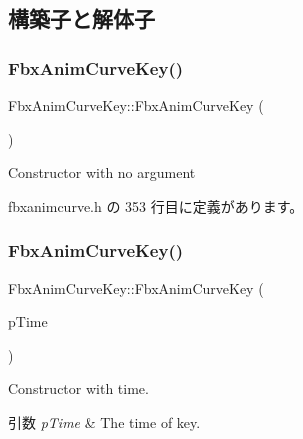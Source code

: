 \subsection{構築子と解体子}
\mbox{\label{class_fbx_anim_curve_key_acc70533fb017bc71b617aaa37ee2e19f}} 
\subsubsection{\texorpdfstring{Fbx\+Anim\+Curve\+Key()}{FbxAnimCurveKey()}\hspace{0.1cm}{\footnotesize\ttfamily [1/4]}}
{\footnotesize\ttfamily Fbx\+Anim\+Curve\+Key\+::\+Fbx\+Anim\+Curve\+Key (\begin{DoxyParamCaption}{ }\end{DoxyParamCaption})\hspace{0.3cm}{\ttfamily [inline]}}

Constructor with no argument 

 fbxanimcurve.\+h の 353 行目に定義があります。

\mbox{\label{class_fbx_anim_curve_key_a5fc23a90c53bc0655161813ee4f6ae00}} 
\subsubsection{\texorpdfstring{Fbx\+Anim\+Curve\+Key()}{FbxAnimCurveKey()}\hspace{0.1cm}{\footnotesize\ttfamily [2/4]}}
{\footnotesize\ttfamily Fbx\+Anim\+Curve\+Key\+::\+Fbx\+Anim\+Curve\+Key (\begin{DoxyParamCaption}\item[{\hyperlink{class_fbx_time}{Fbx\+Time}}]{p\+Time }\end{DoxyParamCaption})\hspace{0.3cm}{\ttfamily [inline]}}

Constructor with time. 
\begin{DoxyParams}{引数}
{\em p\+Time} & The time of key. \\
\hline
\end{DoxyParams}


